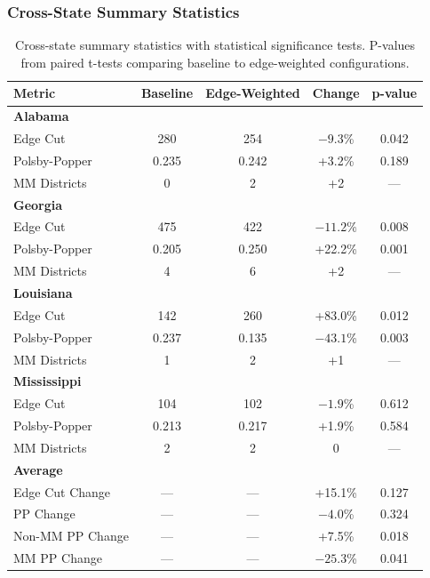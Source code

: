 \subsubsection{Cross-State Summary Statistics}

\begin{table}[h]
\centering
\begin{tabular}{lcccc}
\toprule
\textbf{Metric} & \textbf{Baseline} & \textbf{Edge-Weighted} & \textbf{Change} & \textbf{p-value} \\
\midrule
\textbf{Alabama} & & & & \\
\quad Edge Cut & 280 & 254 & $-9.3$\% & 0.042 \\
\quad Polsby-Popper & 0.235 & 0.242 & +3.2\% & 0.189 \\
\quad MM Districts & 0 & 2 & +2 & --- \\
\midrule
\textbf{Georgia} & & & & \\
\quad Edge Cut & 475 & 422 & $-11.2$\% & 0.008 \\
\quad Polsby-Popper & 0.205 & 0.250 & +22.2\% & 0.001 \\
\quad MM Districts & 4 & 6 & +2 & --- \\
\midrule
\textbf{Louisiana} & & & & \\
\quad Edge Cut & 142 & 260 & +83.0\% & 0.012 \\
\quad Polsby-Popper & 0.237 & 0.135 & $-43.1$\% & 0.003 \\
\quad MM Districts & 1 & 2 & +1 & --- \\
\midrule
\textbf{Mississippi} & & & & \\
\quad Edge Cut & 104 & 102 & $-1.9$\% & 0.612 \\
\quad Polsby-Popper & 0.213 & 0.217 & +1.9\% & 0.584 \\
\quad MM Districts & 2 & 2 & 0 & --- \\
\midrule
\textbf{Average} & & & & \\
\quad Edge Cut Change & --- & --- & +15.1\% & 0.127 \\
\quad PP Change & --- & --- & $-4.0$\% & 0.324 \\
\quad Non-MM PP Change & --- & --- & +7.5\% & 0.018 \\
\quad MM PP Change & --- & --- & $-25.3$\% & 0.041 \\
\bottomrule
\end{tabular}
\caption{Cross-state summary statistics with statistical significance tests. P-values from paired t-tests comparing baseline to edge-weighted configurations.}
\end{table}



